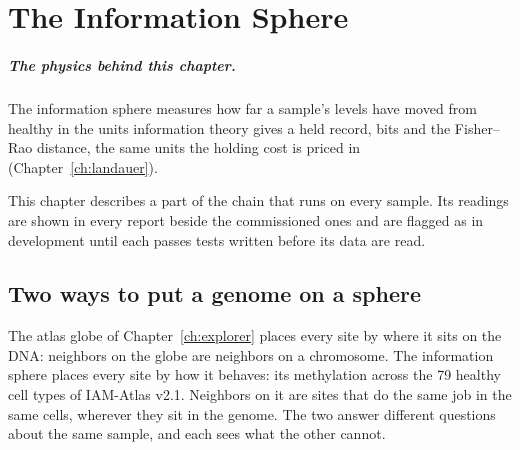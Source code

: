
\chapter{The Information Sphere}\label{ch:infosphere}

\paragraph{The physics behind this chapter.} The information sphere measures how far a sample's levels have moved from healthy in the units information theory gives a held record, bits and the Fisher--Rao distance, the same units the holding cost is priced in (Chapter~\ref{ch:landauer}).

\indevelopment{} This chapter describes a part of the chain that runs on every sample. Its readings are shown in every report beside the commissioned ones and are flagged as in development until each passes tests written before its data are read.

\section{Two ways to put a genome on a sphere}

The atlas globe of Chapter~\ref{ch:explorer} places every site by where it sits on the DNA: neighbors on the globe are neighbors on a
chromosome. The information sphere places every site by how it behaves: its methylation across the 79 healthy cell types of IAM-Atlas
v2.1. Neighbors on it are sites that do the same job in the same cells, wherever they sit in the genome. The two answer different
questions about the same sample, and each sees what the other cannot.

